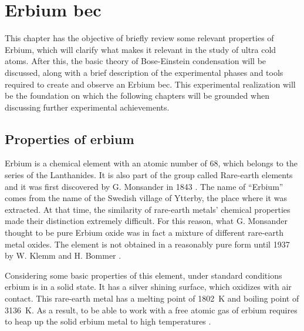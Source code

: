 
\chapter{Erbium \acl*{bec}}
\label{chap:erbium_bec}

This chapter has the objective of briefly review some relevant properties of Erbium, which will clarify what makes it relevant in the study of ultra cold atoms. After this, the basic theory of Bose-Einstein condensation will be discussed, along with a brief description of the experimental phases and tools required to create and observe an Erbium \ac{bec}. This experimental realization will be the foundation on which the following chapters will be grounded when discussing further experimental achievements.

\section{Properties of erbium} \label{sec:erbium_properties}
Erbium is a chemical element with an atomic number of 68, which belongs to the series of the Lanthanides. It is also part of the group called Rare-earth elements and it was first discovered by G. Monsander in 1843 \cite{mosander1843xxx}. The name of ``Erbium'' comes from the name of the Swedish village of Ytterby, the place where it was extracted. At that time, the similarity of rare-earth metals' chemical properties made their distinction extremely difficult. For this reason, what G. Monsander thought to be pure Erbium oxide was in fact a mixture of different rare-earth metal oxides. The element is not obtained in a reasonably pure form until 1937 by W. Klemm and H. Bommer \cite{klemm1937bommer}.

Considering some basic properties of this element, under standard conditions erbium is in a solid state. It has a silver shining surface, which oxidizes with air contact. This rare-earth metal has a melting point of \SI{1802}{\kelvin} and boiling point of \SI{3136}{\kelvin}. As a result, to be able to work with a free atomic gas of erbium requires to heap up the solid erbium metal to high temperatures \cite{emsley1998}.

